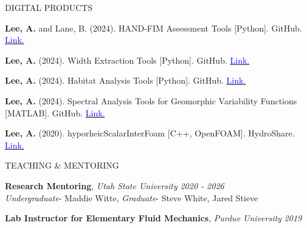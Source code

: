 \documentclass{resume_anzy} %
\begin{document}
\begin{rSection}{DIGITAL PRODUCTS}
\vspace{-2.5mm}

\item \textbf{Lee, A.} and Lane, B. (2024). HAND-FIM Assessment Tools [Python]. GitHub. \href{https://github.com/USU-CIROH/HAND-FIM_Assessment_public}{\textcolor{blue}{Link.}}

\item \textbf{Lee, A.} (2024). Width Extraction Tools [Python]. GitHub. \href{https://github.com/USU-CIROH/width_extraction_public}{\textcolor{blue}{Link.}}

\item \textbf{Lee, A.} (2024). Habitat Analysis Tools [Python]. GitHub. \href{https://github.com/anzylee/habitat_analysis_public}{\textcolor{blue}{Link.}}

\item \textbf{Lee, A.} (2024). Spectral Analysis Tools for  Geomorphic Variability Functions [MATLAB]. GitHub. \href{https://github.com/anzylee/habitat_analysis_public}{\textcolor{blue}{Link.}}

\item \textbf{Lee, A.} (2020). hyporheicScalarInterFoam [C++, OpenFOAM]. HydroShare. \href{https://www.hydroshare.org/resource/dc7e13f675da42a492a4ebf1e1c337d1}{\textcolor{blue}{Link.}}


\end{rSection}



\begin{rSection}{TEACHING \& MENTORING}
\vspace{-2.5mm}

\item {\bf Research Mentoring}, \textit{Utah State University}  \hfill {\em 2020 - 2026}
\\  \textit{Undergraduate}- Maddie Witte, \textit{Graduate}- Steve White, Jared Stieve


\item {\bf Lab Instructor for Elementary Fluid Mechanics}, \textit{Purdue University}  \hfill {\em 2019}


%
%

\end{rSection}
\end{document}
